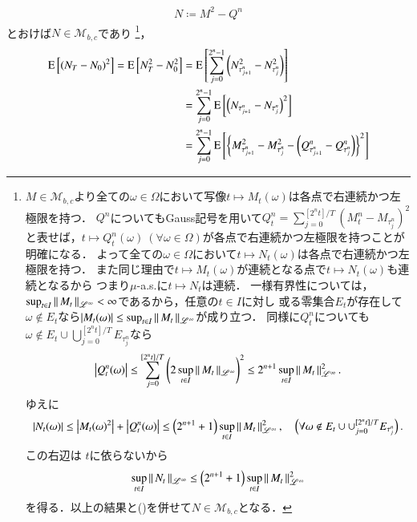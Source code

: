 \begin{prf}
\begin{align}
			N \coloneqq M^2 - Q^n
		\end{align}
		とおけば$N \in \mathcal{M}_{b,c}$であり
		\footnote{
			$M \in \mathcal{M}_{b,c}$より全ての$\omega \in \Omega$において写像$t \longmapsto M_t(\omega)$は各点で右連続かつ左極限を持つ．
			$Q^n$についてもGauss記号を用いて$Q_t^n = \sum_{j=0}^{[2^nt]/T} \left( M_t^n - M_{\tau_j^n} \right)^2$
			と表せば，$t \longmapsto Q_t^n(\omega)\ (\forall \omega \in \Omega)$が各点で右連続かつ左極限を持つことが明確になる．
			よって全ての$\omega \in \Omega$において$t \longmapsto N_t(\omega)$は各点で右連続かつ左極限を持つ．
			また同じ理由で$t \longmapsto M_t(\omega)$が連続となる点で$t \longmapsto N_t(\omega)$も連続となるから
			つまり$\mu$-a.s.に$t \longmapsto N_t$は連続．
			一様有界性については，$\operatorname*{sup}_{t \in I} \left\|\, M_t\, \right\|_{\mathscr{L}^\infty} < \infty$であるから，任意の$t \in I$に対し
			或る零集合$E_t$が存在して$\omega \notin E_t$なら$|M_t(\omega)| \leq \operatorname*{sup}_{t \in I} \left\|\, M_t\, \right\|_{\mathscr{L}^\infty}$が成り立つ．
			同様に$Q_t^n$についても$\omega \notin E_t \cup \bigcup_{j=0}^{[2^nt]/T}E_{\tau_j^n}$なら
			\begin{align}
				\left| Q_t^n(\omega) \right| \leq \sum_{j=0}^{[2^nt]/T} \left( 2\operatorname*{sup}_{t \in I} \left\|\, M_t\, \right\|_{\mathscr{L}^\infty} \right)^2 \leq 2^{n+1} \operatorname*{sup}_{t \in I} \left\|\, M_t\, \right\|_{\mathscr{L}^\infty}^2.
			\end{align}
			ゆえに
			\begin{align}
				\left| N_t(\omega) \right| \leq \left|{M_t(\omega)}^2\right| + \left|Q_t^n(\omega)\right| \leq \left( 2^{n+1}+1 \right) \operatorname*{sup}_{t \in I} \left\|\, M_t\, \right\|_{\mathscr{L}^\infty}^2
				,\quad \left( \forall \omega \notin E_t \cup \cup_{j=0}^{[2^nt]/T}E_{\tau_j^n} \right).
			\end{align}
			この右辺は
			$t$に依らないから
			\begin{align}
				\operatorname*{sup}_{t \in I} \left\|\, N_t\, \right\|_{\mathscr{L}^\infty} \leq \left( 2^{n+1}+1 \right) \operatorname*{sup}_{t \in I} \left\|\, M_t\, \right\|_{\mathscr{L}^\infty}^2
			\end{align}
			を得る．以上の結果と()を併せて$N \in \mathcal{M}_{b,c}$となる．
		}，
		\begin{align}
			\Exp{(N_T - N_0)^2} = \Exp{N_T^2 - N_0^2} &= \Exp{\sum_{j=0}^{2^n-1}\left( N_{\tau_{j+1}^n}^2 - N_{\tau_j^n}^2 \right)} \\
			&= \sum_{j=0}^{2^n-1}\Exp{\left( N_{\tau_{j+1}^n} - N_{\tau_j^n} \right)^2} \\
			&= \sum_{j=0}^{2^n-1}\Exp{\left\{ M_{\tau_{j+1}^n}^2 - M_{\tau_j^n}^2 - \left( Q_{\tau_{j+1}^n}^n - Q_{\tau_j^n}^n \right) \right\}^2} \\

\end{align}
\end{prf}
